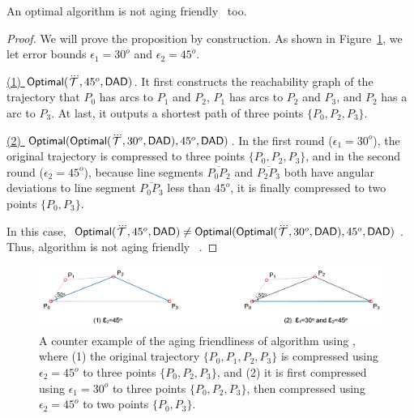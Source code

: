\begin{proposition}
	\label{theo-aging-dp-dad}
	An optimal algorithm is not aging friendly \wrt~\dad too.
\end{proposition}

\begin{proof}
	We will prove the proposition by construction.
	As shown in Figure~\ref{fig:aging-opt-dad}, we let error bounds $\epsilon_1 =30^o$ and $\epsilon_2=45^o$.
	
	\underline{(1) ${{\mathsf{Optimal}}}(\dddot{\mathcal{T}}, 45^o, {\mathsf{DAD}})$}. 
	It first constructs the reachability graph of the trajectory that $P_0$ has arcs to $P_1$ and $P_2$, $P_1$ has arcs to $P_2$ and $P_3$, and $P_2$ has a arc to $P_3$. At last, it outputs a shortest path of three points $\{P_0, P_2, P_3\}$. 
	
	\underline{(2) ${{\mathsf{Optimal}}}({\mathsf{Optimal}}(\dddot{\mathcal{T}}, 30^o, {\mathsf{DAD}}), 45^o, {\mathsf{DAD}})$}. In the first round ($\epsilon_1=30^o$), the original trajectory is compressed to three points $\{P_0, P_2, P_3\}$, and in the second round ($\epsilon_2=45^o$), because line segments  $\overline{P_0P_2}$ and $\overline{P_2P_3}$ both have angular deviations to line segment $\overline{P_0P_3}$ less than $45^o$, it is finally compressed to two points $\{P_0, P_3\}$.
	
	In this case, ${{\mathsf{Optimal}}}(\dddot{\mathcal{T}}, 45^o, {\mathsf{DAD}}) \ne {{\ensuremath {\mathsf{Optimal}}}}({\mathsf{Optimal}}(\dddot{\mathcal{T}}, 30^o, {\mathsf{DAD}}), 45^o, {\mathsf{DAD}})$. Thus, algorithm \opt is not aging friendly \wrt~\dad.
\end{proof}	
	
\begin{figure}
		\centering
		\includegraphics[scale=0.68]{Figures/Fig-aging-opt.png}
		
		\caption{\small A counter example of the aging friendliness of algorithm \opt using \dad, where (1) the original trajectory $\{P_0, P_1, P_2, P_3\}$ is compressed using $\epsilon_2=45^o$ to three points $\{P_0, P_2, P_3\}$, and (2) it is first compressed using $\epsilon_1=30^o$ to three points $\{P_0, P_2, P_3\}$, then compressed using $\epsilon_2=45^o$ to two points $\{P_0, P_3\}$. }
		\vspace{-1ex}
		\label{fig:aging-opt-dad}
\end{figure}

